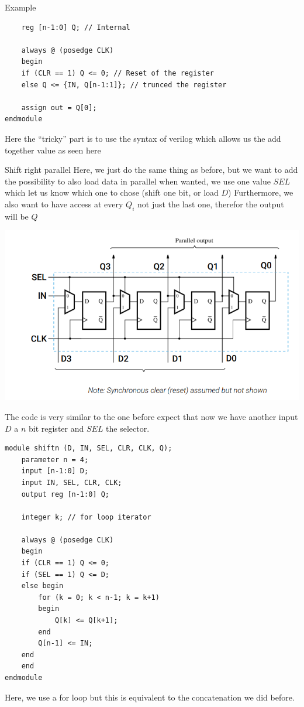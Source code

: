 \begin{parag}{Example}
\begin{lstlisting}
    reg [n-1:0] Q; // Internal

    always @ (posedge CLK)
    begin
    if (CLR == 1) Q <= 0; // Reset of the register
    else Q <= {IN, Q[n-1:1]}; // trunced the register
    
    assign out = Q[0];
endmodule    
    \end{lstlisting}
    Here the ``tricky'' part is to use the syntax of verilog which allows us the add together value as seen here
    
    
    
\end{parag}


\begin{parag}{Shift right parallel}
    Here, we just do the same thing as before, but we want to add the possibility to  also load data in parallel when wanted, we use one value $SEL$ which let us know which one to chose (shift one bit, or load $D$) Furthermore, we also want to have access at every $Q_i$ not just the last one, therefor the output will be $Q$
    \begin{center}
        \includegraphics[scale=0.6]{52025-06-20.png}
    \end{center}
    The code is very similar to the one before expect that now we have another input $D$ a $n$ bit register and $SEL$ the selector. 
    \begin{lstlisting}
module shiftn (D, IN, SEL, CLR, CLK, Q);
    parameter n = 4;
    input [n-1:0] D;
    input IN, SEL, CLR, CLK;
    output reg [n-1:0] Q;

    integer k; // for loop iterator

    always @ (posedge CLK) 
    begin
    if (CLR == 1) Q <= 0;
    if (SEL == 1) Q <= D;
    else begin
        for (k = 0; k < n-1; k = k+1)
        begin
            Q[k] <= Q[k+1];
        end
        Q[n-1] <= IN;
    end
    end
endmodule
    \end{lstlisting}
    \begin{framedremark}
    Here, we use a for loop but this is equivalent to the concatenation we did before.
    \end{framedremark}
    
\end{parag}



